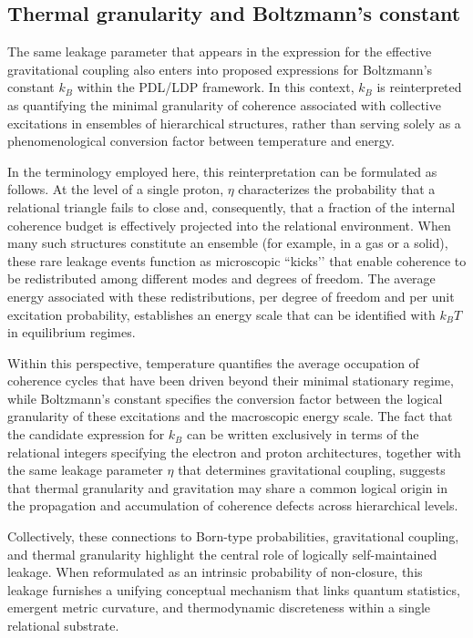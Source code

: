 \documentclass[11pt,a4paper]{article}
\theoremstyle{definition}
\newcommand{\etaL}{\eta} %
\begin{document}
\subsection{Thermal granularity and Boltzmann's constant}

The same leakage parameter that appears in the expression for the effective gravitational coupling also enters into proposed expressions for Boltzmann’s constant \(k_B\) within the PDL/LDP framework. In this context, \(k_B\) is reinterpreted as quantifying the minimal granularity of coherence associated with collective excitations in ensembles of hierarchical structures, rather than serving solely as a phenomenological conversion factor between temperature and energy.

In the terminology employed here, this reinterpretation can be formulated as follows. At the level of a single proton, \(\etaL\) characterizes the probability that a relational triangle fails to close and, consequently, that a fraction of the internal coherence budget is effectively projected into the relational environment. When many such structures constitute an ensemble (for example, in a gas or a solid), these rare leakage events function as microscopic “kicks’’ that enable coherence to be redistributed among different modes and degrees of freedom. The average energy associated with these redistributions, per degree of freedom and per unit excitation probability, establishes an energy scale that can be identified with \(k_B T\) in equilibrium regimes.

Within this perspective, temperature quantifies the average occupation of coherence cycles that have been driven beyond their minimal stationary regime, while Boltzmann’s constant specifies the conversion factor between the logical granularity of these excitations and the macroscopic energy scale. The fact that the candidate expression for \(k_B\) can be written exclusively in terms of the relational integers specifying the electron and proton architectures, together with the same leakage parameter \(\etaL\) that determines gravitational coupling, suggests that thermal granularity and gravitation may share a common logical origin in the propagation and accumulation of coherence defects across hierarchical levels.

Collectively, these connections to Born-type probabilities, gravitational coupling, and thermal granularity highlight the central role of logically self-maintained leakage. When reformulated as an intrinsic probability of non-closure, this leakage furnishes a unifying conceptual mechanism that links quantum statistics, emergent metric curvature, and thermodynamic discreteness within a single relational substrate.
\end{document}

